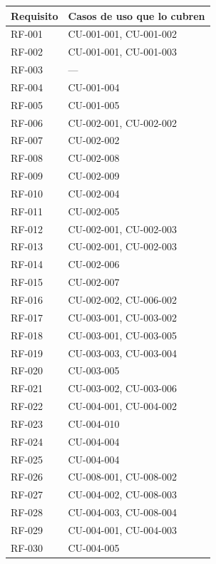 {\small\setlength{\tabcolsep}{4pt}\renewcommand{\arraystretch}{1.15}
\begin{longtable}{|>{\raggedright\arraybackslash}p{2.4cm}|>{\raggedright\arraybackslash}p{12.9cm}|}
\hline
\textbf{Requisito} & \textbf{Casos de uso que lo cubren} \\ \hline\endhead
RF-001 & CU-001-001, CU-001-002 \\ \hline
RF-002 & CU-001-001, CU-001-003 \\ \hline
RF-003 & — \\ \hline
RF-004 & CU-001-004 \\ \hline
RF-005 & CU-001-005 \\ \hline
RF-006 & CU-002-001, CU-002-002 \\ \hline
RF-007 & CU-002-002 \\ \hline
RF-008 & CU-002-008 \\ \hline
RF-009 & CU-002-009 \\ \hline
RF-010 & CU-002-004 \\ \hline
RF-011 & CU-002-005 \\ \hline
RF-012 & CU-002-001, CU-002-003 \\ \hline
RF-013 & CU-002-001, CU-002-003 \\ \hline
RF-014 & CU-002-006 \\ \hline
RF-015 & CU-002-007 \\ \hline
RF-016 & CU-002-002, CU-006-002 \\ \hline
RF-017 & CU-003-001, CU-003-002 \\ \hline
RF-018 & CU-003-001, CU-003-005 \\ \hline
RF-019 & CU-003-003, CU-003-004 \\ \hline
RF-020 & CU-003-005 \\ \hline
RF-021 & CU-003-002, CU-003-006 \\ \hline
RF-022 & CU-004-001, CU-004-002 \\ \hline
RF-023 & CU-004-010 \\ \hline
RF-024 & CU-004-004 \\ \hline
RF-025 & CU-004-004 \\ \hline
RF-026 & CU-008-001, CU-008-002 \\ \hline
RF-027 & CU-004-002, CU-008-003 \\ \hline
RF-028 & CU-004-003, CU-008-004 \\ \hline
RF-029 & CU-004-001, CU-004-003 \\ \hline
RF-030 & CU-004-005 \\ \hline

\end{longtable}}
